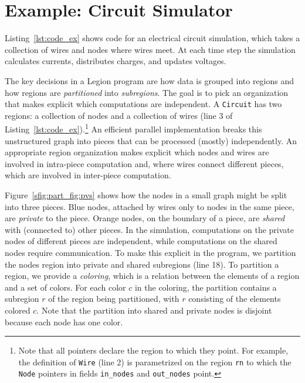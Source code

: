 \section{Example: Circuit Simulator}
\label{sec:ex}

Listing~\ref{lst:code_ex} shows code for an electrical
circuit simulation, which takes a collection of
wires and nodes where wires meet.  
At each time step the simulation calculates 
currents, distributes charges, and updates voltages.

The key decisions in a Legion program are how data is grouped into
regions and how  regions are {\em partitioned} into {\em
subregions}.  
%
%
The goal is to pick an organization that makes explicit
which computations are independent.  
A {\tt Circuit}
has two regions: a collection of nodes and a collection of wires (line
3 of Listing~\ref{lst:code_ex}).\footnote{Note that all pointers declare the region to which they point.  For
example, the definition of {\tt Wire} (line 2) is parametrized on the region
{\tt rn} to which the {\tt Node} pointers in fields {\tt in\_nodes}
and {\tt out\_nodes} point.}
An efficient parallel
implementation breaks this unstructured graph into pieces that can be
processed (mostly) independently. An appropriate
region organization makes explicit which nodes and wires are
involved in intra-piece computation and, where wires connect different pieces,
which are involved in inter-piece computation.

%
Figure~\ref{sfig:part_fig:pvs} shows how the nodes
in a small graph might be split into three pieces.  Blue nodes,
attached by wires only to nodes in the same piece, are 
{\em private} to the piece.  Orange nodes, on the boundary of a
piece, are {\em shared} with (connected to) other pieces.
In the simulation, computations on the
private nodes of different pieces are independent, while
computations on the shared nodes require communication.  To make
this explicit in the program, we partition the nodes region into
private and shared subregions (line 18).  To partition a region, we
provide a {\em coloring}, which is a relation between the elements of
a region and a set of colors.  
For each color $c$ in the coloring, the partition contains a subregion $r$
of the region being partitioned, with $r$ consisting of the elements colored $c$.  Note that the
partition into shared and private nodes is disjoint because each node has one color.

